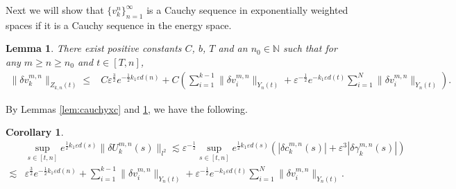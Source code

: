 \documentclass[11pt]{amsart}
\newtheorem{lemma}[theorem]{Lemma}
\newtheorem{corollary}[theorem]{Corollary}
\theoremstyle{remark}
\numberwithin{equation}{section}
\begin{document}
Next we will show that $\{v_k^n\}_{n=1}^\infty$ is a Cauchy sequence in
exponentially weighted spaces if it is a Cauchy sequence in the energy space.
\begin{lemma}
  \label{lem:vkxkdif}
There exist positive constants $C$, $b$, $T$ and an $n_0\in{\mathbb{N}}$ such that
for any $m\ge n\ge n_0$ and  $t\in [T,n]$,
\begin{align*}
 \|{\delta v}_k^{m,n}\|_{Z_{k,n}(t)} \le & C{\varepsilon}^{\frac32}e^{-\frac12k_1{\varepsilon} d(n)}
+C\left(\sum_{i=1}^{k-1}\|{\delta v}_i^{m,n}\|_{Y_n(t)}
+{\varepsilon}^{-\frac12}e^{-k_1{\varepsilon} d(t)}\sum_{i=1}^{N}\|{\delta v}_i^{m,n}\|_{Y_n(t)}\right).
\end{align*}
\end{lemma}
By Lemmas \ref{lem:cauchyxc} and \ref{lem:vkxkdif}, we have the following.
\begin{corollary}
  \label{cor:ucdiff}
  \begin{align*}
& \sup_{s\in[t,n]}e^{\frac12k_1{\varepsilon} d(s)}\|{\delta U}_k^{m,n}(s)\|_{l^2} 
 \lesssim {\varepsilon}^{-\frac12}\sup_{s\in[t,n]}e^{\frac12k_1{\varepsilon} d(s)}
(|{\delta c}^{m,n}_k(s)|+{\varepsilon}^3|{\delta\gamma}^{m,n}_k(s)|)
\\ \lesssim & 
{\varepsilon}^{\frac32}e^{-\frac12k_1{\varepsilon} d(n)}+\sum_{i=1}^{k-1}\|{\delta v}_i^{m,n}\|_{Y_n(t)}
+ {\varepsilon}^{-\frac12}e^{-k_1{\varepsilon} d(t)}\sum_{i=1}^N \|{\delta v}_i^{m,n}\|_{Y_n(t)}.
  \end{align*}
\end{corollary}
\end{document}
